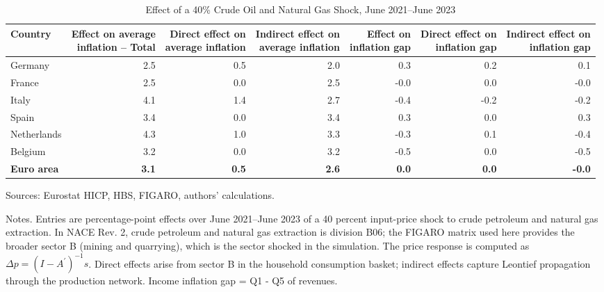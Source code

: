\documentclass[11pt]{article}
\begin{document}
\begin{table}[H]
\centering
\caption{Effect of a 40\% Crude Oil and Natural Gas Shock, June 2021--June 2023}
\scriptsize
\setlength{\tabcolsep}{4.2pt}
\begin{tabular}{lrrrrrr}
\toprule
Country & \shortstack{Effect on average\\inflation -- Total} & \shortstack{Direct effect on\\average inflation} & \shortstack{Indirect effect on\\average inflation} & \shortstack{Effect on\\inflation gap} & \shortstack{Direct effect on\\inflation gap} & \shortstack{Indirect effect on\\inflation gap}
 \\
\midrule
Germany & 2.5 & 0.5 & 2.0 & 0.3 & 0.2 & 0.1
 \\
France & 2.5 & 0.0 & 2.5 & -0.0 & 0.0 & -0.0
 \\
Italy & 4.1 & 1.4 & 2.7 & -0.4 & -0.2 & -0.2
 \\
Spain & 3.4 & 0.0 & 3.4 & 0.3 & 0.0 & 0.3
 \\
Netherlands & 4.3 & 1.0 & 3.3 & -0.3 & 0.1 & -0.4
 \\
Belgium & 3.2 & 0.0 & 3.2 & -0.5 & 0.0 & -0.5
 \\
\midrule
\textbf{Euro area} & \textbf{3.1} & \textbf{0.5} & \textbf{2.6} & \textbf{0.0} & \textbf{0.0} & \textbf{-0.0}
 \\
\bottomrule
\end{tabular}
\par\vspace{0.35em}\footnotesize\noindent Sources: Eurostat HICP, HBS, FIGARO, authors' calculations.
\par\vspace{0.25em}\footnotesize\noindent Notes. Entries are percentage-point effects over June 2021--June 2023 of a 40 percent input-price shock to crude petroleum and natural gas extraction. In NACE Rev. 2, crude petroleum and natural gas extraction is division B06; the FIGARO matrix used here provides the broader sector B (mining and quarrying), which is the sector shocked in the simulation. The price response is computed as $\Delta p = (I - A^{\prime})^{-1}s$. Direct effects arise from sector B in the household consumption basket; indirect effects capture Leontief propagation through the production network. Income inflation gap = Q1 - Q5 of revenues.
\end{table}
\vspace{0.6em}
\end{document}
